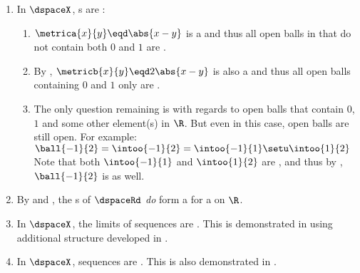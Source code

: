 \begin{example}
\begin{enumerate}
  \item In $\dspaceX$, s are : \label{item:dspace_21_oballo}
    \begin{enumerate}
      \item $\metrica{x}{y}\eqd\abs{x-y}$ is a  and thus all open balls in that do not contain both $0$ and $1$ are .
      \item By , $\metricb{x}{y}\eqd2\abs{x-y}$ is also a  and thus all open balls containing $0$ and $1$ only are .
      \item The only question remaining is with regards to open balls that contain $0$, $1$ and some other element(s) in $\R$.
            But even in this case, open balls are still open. For example:
        \\\indentx$\ball{-1}{2} = \intoo{-1}{2} = \intoo{-1}{1}\setu\intoo{1}{2}$\\
        Note that both $\intoo{-1}{1}$ and $\intoo{1}{2}$ are , and thus by ,
        $\ball{-1}{2}$ is  as well.
    \end{enumerate}

  \item By  and , 
        the s of $\dspaceRd$ \emph{do} form a  for a  on $\R$.

  \item In $\dspaceX$, the limits of  sequences are .
        This is demonstrated in  using additional structure developed in .

  \item In $\dspaceX$,  sequences are .
        This is also demonstrated in .

\end{enumerate}
\end{example}

